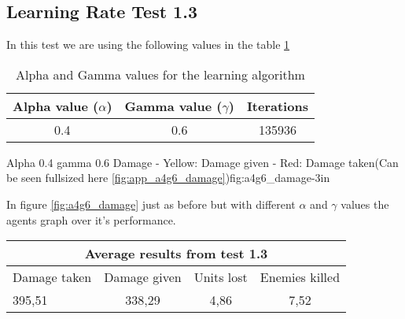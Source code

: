 
\subsection*{Learning Rate Test 1.3}
In this test we are using the following values in the table \ref{a4g6_table}

\begin{centering}
\begin{table}[H]
 \begin{tabular}{|c|c|c|}
	\hline
		Alpha value ($\alpha$) & Gamma value ($\gamma$) & Iterations\\
	\hline
		0.4 & 0.6 & 135936 \\
	\hline
\end{tabular}
\label{a4g6_table}
\caption{Alpha and Gamma values for the learning algorithm}
\end{table}
\end{centering}

			{Alpha 0.4 gamma 0.6 Damage - Yellow: Damage given - Red: Damage taken(Can be seen fullsized here \ref{fig:app_a4g6_damage})}{fig:a4g6_damage}{-3in}

In figure \ref{fig:a4g6_damage} just as before but with different $\alpha$ and $\gamma$ values the agents graph over it's performance.




\begin{centering}
 \begin{tabular}{|l|c|c|c|}
	\multicolumn{4}{c}{Average results from test 1.3} \\
	\hline
		Damage taken & Damage given & Units lost & Enemies killed\\
	\hline
		395,51 & 338,29 & 4,86 & 7,52 \\
	\hline
\end{tabular}
\label{test1.3}
\end{centering}
\newpage

